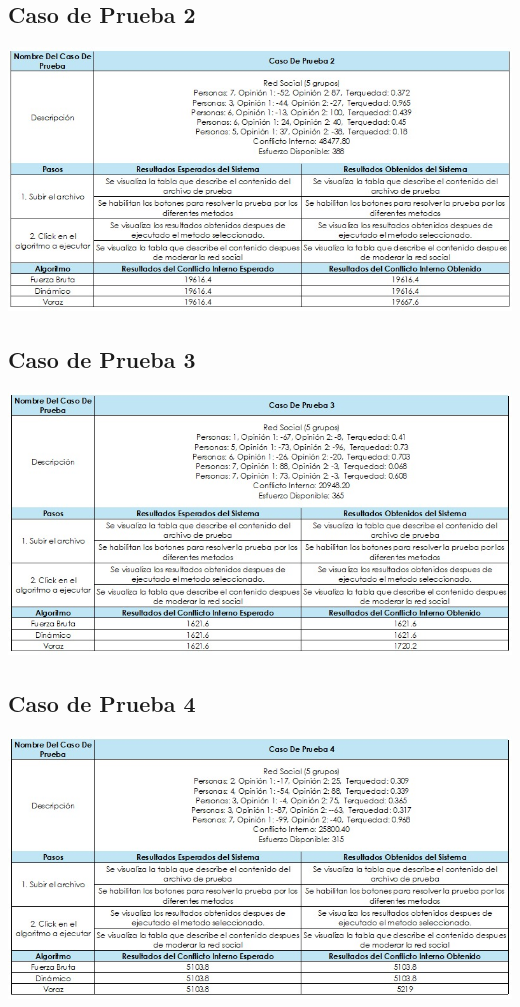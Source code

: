 \documentclass[11pt,letter]{article}
\begin{document}
    \subsection{Caso de Prueba 2}
    \begin{flushleft}
        \includegraphics[width=\linewidth]{resources/cp2.jpeg}
    \end{flushleft}

    \subsection{Caso de Prueba 3}
    \begin{flushleft}
        \includegraphics[width=\linewidth]{resources/cp3.jpeg}
    \end{flushleft}

    \subsection{Caso de Prueba 4}
    \begin{flushleft}
        \includegraphics[width=\linewidth]{resources/cp4.jpeg}
    \end{flushleft}
\end{document}

